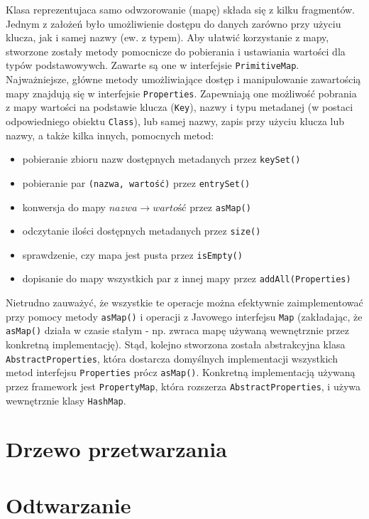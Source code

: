 Klasa reprezentujaca samo odwzorowanie (mapę) składa się z kilku fragmentów. Jednym z założeń było
umożliwienie dostępu do danych zarówno przy użyciu klucza, jak i samej nazwy (ew. z typem). Aby
ułatwić korzystanie z mapy, stworzone zostały metody pomocnicze do pobierania i ustawiania wartości
dla typów podstawowywch. Zawarte są one w interfejsie \texttt{PrimitiveMap}. Najważniejsze, główne
metody umożliwiające dostęp i manipulowanie zawartością mapy znajdują się w interfejsie
\texttt{Properties}. Zapewniają one możliwość pobrania z mapy wartości na podstawie klucza
(\texttt{Key}), nazwy i typu metadanej (w postaci odpowiedniego obiektu \texttt{Class}), lub samej
nazwy, zapis przy użyciu klucza lub nazwy, a także kilka innych, pomocnych metod:

\begin{itemize}
  \item pobieranie zbioru nazw dostępnych metadanych przez \texttt{keySet()}
  \item pobieranie par \texttt{(nazwa, wartość)} przez \texttt{entrySet()} 
  \item konwersja do mapy $nazwa \to wartość$ przez \texttt{asMap()}
  \item odczytanie ilości dostępnych metadanych przez \texttt{size()}
  \item sprawdzenie, czy mapa jest pusta przez \texttt{isEmpty()}
  \item dopisanie do mapy wszystkich par z innej mapy przez \texttt{addAll(Properties)}
\end{itemize}

Nietrudno zauważyć, że wszystkie te operacje można efektywnie zaimplementować przy pomocy metody
\texttt{asMap()} i operacji z Javowego interfejsu \texttt{Map} (zakładając, że \texttt{asMap()}
działa w czasie stałym - np. zwraca mapę używaną wewnętrznie przez konkretną implementację). Stąd,
kolejno stworzona została abstrakcyjna klasa \texttt{AbstractProperties}, która dostarcza domyślnych
implementacji wszystkich metod interfejsu \texttt{Properties} prócz \texttt{asMap()}. Konkretną
implementacją używaną przez framework jest \texttt{PropertyMap}, która rozszerza
\texttt{AbstractProperties}, i używa wewnętrznie klasy \texttt{HashMap}.

\section{Drzewo przetwarzania}


\section{Odtwarzanie}


